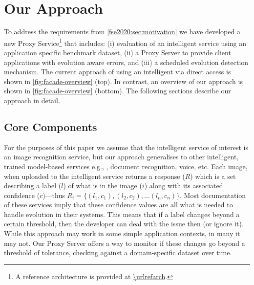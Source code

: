 \section{Our Approach}
\label{fse2020:sec:solution}

To address the requirements from \cref{fse2020:sec:motivation} we have developed a new Proxy Service\footnote{A reference architecture is provided at \url{\urlrefarch}.} that includes: (i) evaluation of an intelligent service using an application specific benchmark dataset, (ii) a Proxy Server to provide client applications with evolution aware errors, and (iii) a scheduled evolution detection mechanism. The current approach of using an intelligent  via direct access is shown in \cref{fig:facade-overview} (top). In contrast, an overview of our approach is shown in \cref{fig:facade-overview} (bottom). The following sections describe our approach in detail. 

\subsection{Core Components}

For the purposes of this paper we assume that the intelligent service of interest is an image recognition service, but our approach generalises to other intelligent, trained model-based services e.g., , document recognition, voice, etc. Each image, when uploaded to the intelligent service returns a response ($R$) which is a set describing a label ($l$) of what is in the image ($i$) along with its associated confidence ($c$)---thus $R_{i} = \{ (l_{1}, c_{1}), (l_{2}, c_{2}), \dots (l_{n}, c_{n}) \}$. Most documentation of these services imply that these confidence values are all what is needed to handle evolution in their systems. This means that if a label changes beyond a certain threshold, then the developer can deal with the issue then (or ignore it). While this approach may work in some simple application contexts, in many it may not. Our Proxy Server offers a way to monitor if these changes go beyond a threshold of tolerance, checking against a domain-specific dataset over time.

